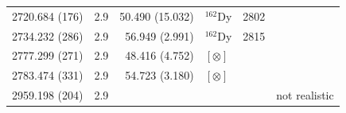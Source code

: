 \begin{landscape}
\begin{center}
\begin{longtable}{p{2.6cm}|p{1.2cm}|r|p{1.1cm}|p{2.0cm}|l}
  2720.684 (176) & 2.9        &50.490 (15.032)& $^{162}$Dy & 2802 & \\   
  2734.232 (286) & 2.9        &56.949  (2.991)& $^{162}$Dy & 2815 & \\   
  2777.299 (271) & 2.9        &48.416  (4.752)& $[\otimes]$ & & \\   
  2783.474 (331) & 2.9        &54.723  (3.180)& $[\otimes]$ & &\\   
  2959.198 (204) & 2.9        && & & not realistic\\   

\end{longtable}
\end{center}
\end{landscape}
